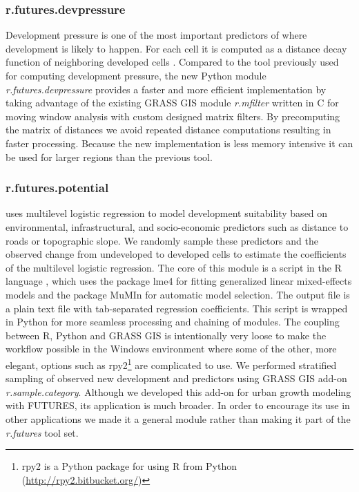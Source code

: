\documentclass{isprs}
\begin{document}
\subsubsection{r.futures.devpressure}
Development pressure is one of the most
important predictors of where development is likely to happen.
For each cell it is computed as a distance decay function of neighboring
developed cells \cite{Meentemeyer2012}.
Compared to the tool previously used for computing development pressure,
the new Python module \emph{r.futures.devpressure} provides a faster and more efficient 
implementation by taking advantage of the existing GRASS GIS 
module \emph{r.mfilter} written in C for moving window analysis with custom designed matrix filters.
By precomputing the matrix of distances we avoid repeated distance computations
resulting in faster processing. 
Because the new implementation
is less memory intensive 
it can be used for
larger regions than the previous tool. 

\subsubsection{r.futures.potential}
uses multilevel logistic regression  to model development
suitability based on environmental, infrastructural, and socio-economic predictors such as distance to roads or topographic slope.
We randomly sample these predictors and the observed change from undeveloped to developed cells
to estimate the coefficients of the multilevel logistic regression.
The core of this
module is a script in the R language \cite{rstats}, which uses the package lme4 \cite{lme4}
for fitting generalized linear mixed-effects models and the package MuMIn \cite{mumin}
for automatic model selection.
The output file is a plain text file with tab-separated regression coefficients.
This script is wrapped in Python for more seamless processing
and chaining of modules. 
The coupling between R, Python and GRASS GIS
is intentionally very loose to make the workflow possible in the Windows environment
where some of the other, more elegant, options such as
rpy2\footnote{rpy2 is a Python package for using R from Python (\url{http://rpy2.bitbucket.org/})} are complicated to use.
We performed stratified sampling of observed new development and predictors using GRASS GIS add-on \emph{r.sample.category}. 
Although we developed this add-on for urban growth modeling with FUTURES,
its application is much broader. 
In order to encourage its use in other applications we made it a general module rather than making it part of the \emph{r.futures} tool set.
\end{document}
